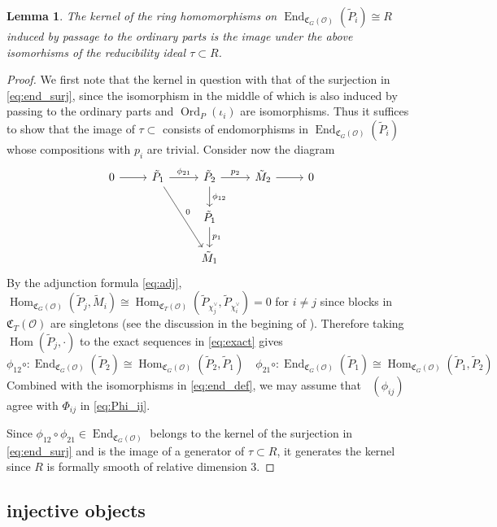\documentclass[leqno]{amsart}
\newcommand{\fC}{\mathfrak C}
\DeclareMathOperator{\V}{\check{\mathbf{V}}} %
\DeclareMathOperator{\Ord}{Ord}
\newcommand{\oo}{\mathcal{O}} %
\DeclareMathOperator{\End}{End}
\DeclareMathOperator{\Hom}{Hom}
\newtheorem{lem}[thm]{Lemma}
\theoremstyle{definition}
\theoremstyle{remark}
\begin{document}
\begin{lem}\label{lem:ker_ord}
	The kernel of the ring homomorphisms
	on $\End_{\fC_G(\oo)}(\tilde{P}_i)\cong R$
	induced by passage to the ordinary parts
	is the image under the above isomorhisms
	of the reducibility ideal $\tau\subset R$.
\end{lem}
\begin{proof}

We first note that the kernel in question 
with that of the surjection in \eqref{eq:end_surj},
since the isomorphism in the middle of which
is also induced by passing to the ordinary parts
and $\Ord_P(\iota_i)$ are isomorphisms.
Thus it suffices to show that 
the image of $\tau\subset$
consists of endomorphisms  in  $\End_{\fC_G(\oo)}(\tilde{P}_i)$
whose compositions with $p_i$ are trivial.
Consider now the diagram
\[
	\begin{tikzcd}
		0 \arrow[r]&
		\tilde{P}_1  \arrow[r,"\phi_{21}"] \arrow[ddr,"0"] &
		\tilde{P}_2 \arrow[r,"p_2"] \arrow[d,"\phi_{12}"] &
		\tilde{M}_2  \arrow[r] & 0 \\
		 &
		 &
		\tilde{P}_1  \arrow[d,"p_1"] &
		 & \\
				      &  
				      & \tilde{M}_1  & & 
	\end{tikzcd}
\]
By the adjunction formula \eqref{eq:adj}, 
$\Hom_{\fC_G(\oo)}(\tilde{P}_j,\tilde{M}_i)\cong
\Hom_{\fC_T(\oo)}(\tilde{P}_{\chi_j^\vee}, \tilde{P}_{\chi_i^\vee})=0$
for $i\neq j$
since blocks in $\fC_T(\oo)$ are singletons
(see the discussion in the begining of \cite[\S 7.2]{pask}).
Therefore taking $\Hom(\tilde{P}_j,\cdot)$ to the exact sequences in
\eqref{eq:exact} gives
\[
	\phi_{12}\circ\colon
	\End_{\fC_G(\oo)}(\tilde{P}_2)\cong
	\Hom_{\fC_G(\oo)}(\tilde{P}_2, \tilde{P}_1)\quad
	\phi_{21}\circ\colon
	\End_{\fC_G(\oo)}(\tilde{P}_1)\cong
	\Hom_{\fC_G(\oo)}(\tilde{P}_1, \tilde{P}_2)
\]
Combined with the isomorphisms in \eqref{eq:end_def},
we may assume that $\V(\phi_{ij})$ agree with 
$\Phi_{ij}$ in \eqref{eq:Phi_ij}.

Since $\phi_{12}\circ\phi_{21}\in \End_{\fC_G(\oo)}$
belongs to the kernel of the surjection in \eqref{eq:end_surj}
and is the image of a generator 
of $\tau\subset R$,
it generates the kernel 
since  $R$ is formally smooth of relative dimension  $3$.
\end{proof}




\subsection{injective objects}
\end{document}
